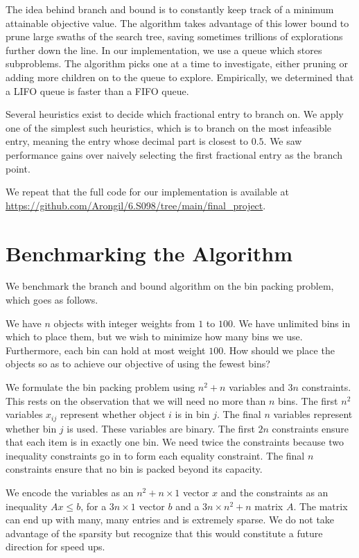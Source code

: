 \documentclass{article}
\begin{document}
The idea behind branch and bound is to constantly keep track of a minimum attainable objective value. The algorithm takes advantage of this lower bound to prune large swaths of the search tree, saving sometimes trillions of explorations further down the line. In our implementation, we use a queue which stores subproblems. The algorithm picks one at a time to investigate, either pruning or adding more children on to the queue to explore. Empirically, we determined that a LIFO queue is faster than a FIFO queue.

Several heuristics exist to decide which fractional entry to branch on. We apply one of the simplest such heuristics, which is to branch on the most infeasible entry, meaning the entry whose decimal part is closest to $0.5$. We saw performance gains over naively selecting the first fractional entry as the branch point.

We repeat that the full code for our implementation is available at \url{https://github.com/Arongil/6.S098/tree/main/final_project}.

\section*{Benchmarking the Algorithm}

We benchmark the branch and bound algorithm on the bin packing problem, which goes as follows.

We have $n$ objects with integer weights from $1$ to $100$. We have unlimited bins in which to place them, but we wish to minimize how many bins we use. Furthermore, each bin can hold at most weight $100$. How should we place the objects so as to achieve our objective of using the fewest bins?

We formulate the bin packing problem using $n^2 + n$ variables and $3n$ constraints. This rests on the observation that we will need no more than $n$ bins. The first $n^2$ variables $x_{ij}$ represent whether object $i$ is in bin $j$. The final $n$ variables represent whether bin $j$ is used. These variables are binary. The first $2n$ constraints ensure that each item is in exactly one bin. We need twice the constraints because two inequality constraints go in to form each equality constraint. The final $n$ constraints ensure that no bin is packed beyond its capacity.

We encode the variables as an $n^2 + n \times 1$ vector $x$ and the constraints as an inequality $Ax \leq b$, for a $3n \times 1$ vector $b$ and a $3n \times n^2 + n$ matrix $A$. The matrix can end up with many, many entries and is extremely sparse. We do not take advantage of the sparsity but recognize that this would constitute a future direction for speed ups.
\end{document}
